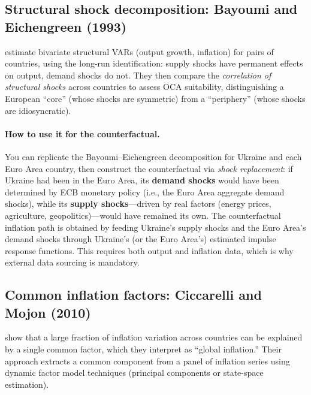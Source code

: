 \documentclass[11pt,a4paper]{article}
\begin{document}
\subsection*{Structural shock decomposition: Bayoumi and Eichengreen (1993)}

\citet{bayoumi_eichengreen1993} estimate bivariate structural VARs (output
growth, inflation) for pairs of countries, using the \citet{blanchard_quah1989}
long-run identification: supply shocks have permanent effects on output, demand
shocks do not. They then compare the \emph{correlation of structural shocks}
across countries to assess OCA suitability, distinguishing a European ``core''
(whose shocks are symmetric) from a ``periphery'' (whose shocks are
idiosyncratic).

\paragraph{How to use it for the counterfactual.}
You can replicate the Bayoumi--Eichengreen decomposition for Ukraine and each
Euro Area country, then construct the counterfactual via \emph{shock
replacement}: if Ukraine had been in the Euro Area, its \textbf{demand shocks}
would have been determined by ECB monetary policy (i.e., the Euro Area aggregate
demand shocks), while its \textbf{supply shocks}---driven by real factors
(energy prices, agriculture, geopolitics)---would have remained its own. The
counterfactual inflation path is obtained by feeding Ukraine's supply shocks and
the Euro Area's demand shocks through Ukraine's (or the Euro Area's) estimated
impulse response functions. This requires both output and inflation data, which
is why external data sourcing is mandatory.


\subsection*{Common inflation factors: Ciccarelli and Mojon (2010)}

\citet{ciccarelli_mojon2010} show that a large fraction of inflation variation
across countries can be explained by a single common factor, which they
interpret as ``global inflation.'' Their approach extracts a common component
from a panel of inflation series using dynamic factor model techniques
(principal components or state-space estimation).
\end{document}
